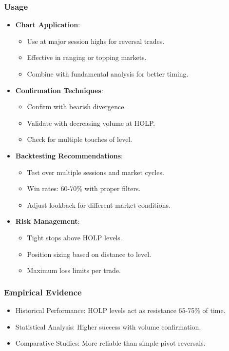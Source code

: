\documentclass[12pt]{article}
\begin{document}
\subsubsection{Usage}
\begin{itemize}
\item \textbf{Chart Application}:
  \begin{itemize}
  \item Use at major session highs for reversal trades.
  \item Effective in ranging or topping markets.
  \item Combine with fundamental analysis for better timing.
  \end{itemize}
\item \textbf{Confirmation Techniques}:
  \begin{itemize}
  \item Confirm with bearish divergence.
  \item Validate with decreasing volume at HOLP.
  \item Check for multiple touches of level.
  \end{itemize}
\item \textbf{Backtesting Recommendations}:
  \begin{itemize}
  \item Test over multiple sessions and market cycles.
  \item Win rates: 60-70\% with proper filters.
  \item Adjust lookback for different market conditions.
  \end{itemize}
\item \textbf{Risk Management}:
  \begin{itemize}
  \item Tight stops above HOLP levels.
  \item Position sizing based on distance to level.
  \item Maximum loss limits per trade.
  \end{itemize}
\end{itemize}

\subsubsection{Empirical Evidence}
\begin{itemize}
\item Historical Performance: HOLP levels act as resistance 65-75\% of time.
\item Statistical Analysis: Higher success with volume confirmation.
\item Comparative Studies: More reliable than simple pivot reversals.
\end{itemize}
\end{document}
